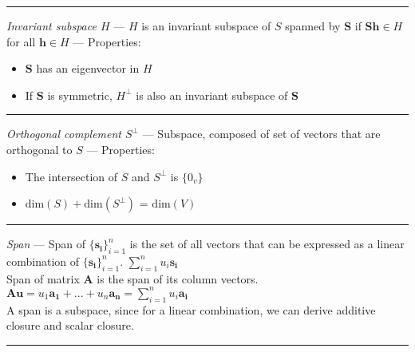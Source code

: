 {\color{lightgray}\hrule height 0.001mm}

\emph{Invariant subspace $H$} --- $H$ is an invariant subspace of $S$ spanned by $\boldsymbol{S}$ if $\boldsymbol{S}\boldsymbol{h} \in H$ for all $\boldsymbol{h} \in H$ --- Properties:
\begin{itemize}
    \item $\boldsymbol{S}$ has an eigenvector in $H$
    \item If $\boldsymbol{S}$ is symmetric, $H^\bot$ is also an invariant subspace of $\boldsymbol{S}$
\end{itemize}

{\color{lightgray}\hrule height 0.001mm}

\emph{Orthogonal complement $S^{\bot}$} --- Subspace, composed of set of vectors that are orthogonal to $S$ --- Properties:
\begin{multicols}{2}
\begin{itemize}
    \item The intersection of $S$ and $S^{\bot}$ is $\{0_v\}$
    \item $\textrm{dim}(S) + \textrm{dim}(S^{\bot})$ = $\textrm{dim}(V)$
\end{itemize}
\end{multicols}

{\color{lightgray}\hrule height 0.001mm}

\emph{Span} --- Span of $\{\boldsymbol{s_i}\}_{i=1}^n$ is the set of all vectors that can be expressed as a linear combination of $\{\boldsymbol{s_i}\}_{i=1}^n$.
$\sum_{i=1}^n u_i \boldsymbol{s_i}$
\\
Span of matrix $\boldsymbol{A}$ is the span of its column vectors.
$\boldsymbol{A}\boldsymbol{u} = u_1 \boldsymbol{a_1} + ... + u_n \boldsymbol{a_n} = \sum_{i=1}^n u_i \boldsymbol{a_i}$
\\
A span is a subspace, since for a linear combination, we can derive additive closure and scalar closure.

{\color{lightgray}\hrule height 0.001mm}

